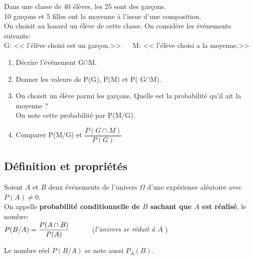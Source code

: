 
\everymath{\displaystyle}

  
  \begin{lemma}
  Dans une classe de 40 élèves, les 25 sont des garçons.\\ 10 garçons et 5 filles ont la moyenne à l'issue d'une composition. \\On choisit au hasard un élève de cette classe. On considère les événements suivants:\\ G: << l'élève choisi est un garçon.>>  $ \quad $
 M: << l'élève choisi a la moyenne.>>
\begin{enumerate}
\item Décrire l'événement G$ \cap $M.
\item Donner les valeurs de P(G), P(M) et P( G$ \cap $M).
\item On choisit  un élève parmi les garçons. Quelle est la probabilité qu'il ait la moyenne ? \\On note cette probabilité par P(M/G).
\item Comparer P(M/G) \;et \;$ \dfrac{P( G \cap M)}{P(G)} $
\end{enumerate}
  \end{lemma}
  \subsection{Définition et propriétés}
\begin{definition}
Soient $A$ et $B$ deux événements de l'univers $ \Omega $ d'une expérience aléatoire avec $ P(A)\neq 0 $.\\On appelle \textbf{probabilité conditionnelle de $B$ sachant que $A$ est réalisé}, le nombre: \\

$ P(B/A)=\dfrac{P( A \cap B)}{P(A)}   \hspace*{1cm}$ (\textit{l'univers se réduit à $A$} )


\medskip


Le nombre réel  $P(B/A)$ se note aussi $P_{A}(B)$.
\end{definition}

